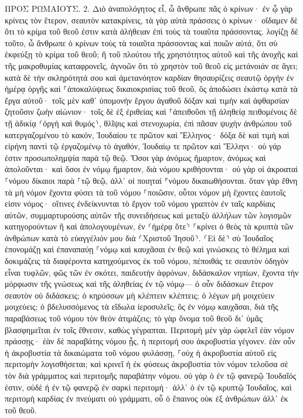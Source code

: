 \documentclass[twoside, 9pt]{extreport}
\begin{document}
ΠΡΟΣ ΡΩΜΑΙΟΥΣ.
2.
Διὸ ἀναπολόγητος εἶ, ὦ ἄνθρωπε πᾶς ὁ κρίνων· ἐν ᾧ γὰρ κρίνεις τὸν ἕτερον, σεαυτὸν κατακρίνεις, τὰ γὰρ αὐτὰ πράσσεις ὁ κρίνων· 
οἴδαμεν δὲ ὅτι τὸ κρίμα τοῦ θεοῦ ἐστιν κατὰ ἀλήθειαν ἐπὶ τοὺς τὰ τοιαῦτα πράσσοντας. 
λογίζῃ δὲ τοῦτο, ὦ ἄνθρωπε ὁ κρίνων τοὺς τὰ τοιαῦτα πράσσοντας καὶ ποιῶν αὐτά, ὅτι σὺ ἐκφεύξῃ τὸ κρίμα τοῦ θεοῦ; 
ἢ τοῦ πλούτου τῆς χρηστότητος αὐτοῦ καὶ τῆς ἀνοχῆς καὶ τῆς μακροθυμίας καταφρονεῖς, ἀγνοῶν ὅτι τὸ χρηστὸν τοῦ θεοῦ εἰς μετάνοιάν σε ἄγει; 
κατὰ δὲ τὴν σκληρότητά σου καὶ ἀμετανόητον καρδίαν θησαυρίζεις σεαυτῷ ὀργὴν ἐν ἡμέρᾳ ὀργῆς καὶ ⸀ἀποκαλύψεως δικαιοκρισίας τοῦ θεοῦ, 
ὃς ἀποδώσει ἑκάστῳ κατὰ τὰ ἔργα αὐτοῦ· 
τοῖς μὲν καθ᾽ ὑπομονὴν ἔργου ἀγαθοῦ δόξαν καὶ τιμὴν καὶ ἀφθαρσίαν ζητοῦσιν ζωὴν αἰώνιον· 
τοῖς δὲ ἐξ ἐριθείας καὶ ⸀ἀπειθοῦσι τῇ ἀληθείᾳ πειθομένοις δὲ τῇ ἀδικίᾳ ⸂ὀργὴ καὶ θυμός⸃, 
θλῖψις καὶ στενοχωρία, ἐπὶ πᾶσαν ψυχὴν ἀνθρώπου τοῦ κατεργαζομένου τὸ κακόν, Ἰουδαίου τε πρῶτον καὶ Ἕλληνος· 
δόξα δὲ καὶ τιμὴ καὶ εἰρήνη παντὶ τῷ ἐργαζομένῳ τὸ ἀγαθόν, Ἰουδαίῳ τε πρῶτον καὶ Ἕλληνι· 
οὐ γάρ ἐστιν προσωπολημψία παρὰ τῷ θεῷ. 
Ὅσοι γὰρ ἀνόμως ἥμαρτον, ἀνόμως καὶ ἀπολοῦνται· καὶ ὅσοι ἐν νόμῳ ἥμαρτον, διὰ νόμου κριθήσονται· 
οὐ γὰρ οἱ ἀκροαταὶ ⸀νόμου δίκαιοι παρὰ ⸀τῷ θεῷ, ἀλλ᾽ οἱ ποιηταὶ ⸁νόμου δικαιωθήσονται. 
ὅταν γὰρ ἔθνη τὰ μὴ νόμον ἔχοντα φύσει τὰ τοῦ νόμου ⸀ποιῶσιν, οὗτοι νόμον μὴ ἔχοντες ἑαυτοῖς εἰσιν νόμος· 
οἵτινες ἐνδείκνυνται τὸ ἔργον τοῦ νόμου γραπτὸν ἐν ταῖς καρδίαις αὐτῶν, συμμαρτυρούσης αὐτῶν τῆς συνειδήσεως καὶ μεταξὺ ἀλλήλων τῶν λογισμῶν κατηγορούντων ἢ καὶ ἀπολογουμένων, 
ἐν ⸂ἡμέρᾳ ὅτε⸃ ⸀κρίνει ὁ θεὸς τὰ κρυπτὰ τῶν ἀνθρώπων κατὰ τὸ εὐαγγέλιόν μου διὰ ⸂Χριστοῦ Ἰησοῦ⸃. 
⸂Εἰ δὲ⸃ σὺ Ἰουδαῖος ἐπονομάζῃ καὶ ἐπαναπαύῃ ⸀νόμῳ καὶ καυχᾶσαι ἐν θεῷ 
καὶ γινώσκεις τὸ θέλημα καὶ δοκιμάζεις τὰ διαφέροντα κατηχούμενος ἐκ τοῦ νόμου, 
πέποιθάς τε σεαυτὸν ὁδηγὸν εἶναι τυφλῶν, φῶς τῶν ἐν σκότει, 
παιδευτὴν ἀφρόνων, διδάσκαλον νηπίων, ἔχοντα τὴν μόρφωσιν τῆς γνώσεως καὶ τῆς ἀληθείας ἐν τῷ νόμῳ— 
ὁ οὖν διδάσκων ἕτερον σεαυτὸν οὐ διδάσκεις; ὁ κηρύσσων μὴ κλέπτειν κλέπτεις; 
ὁ λέγων μὴ μοιχεύειν μοιχεύεις; ὁ βδελυσσόμενος τὰ εἴδωλα ἱεροσυλεῖς; 
ὃς ἐν νόμῳ καυχᾶσαι, διὰ τῆς παραβάσεως τοῦ νόμου τὸν θεὸν ἀτιμάζεις; 
τὸ γὰρ ὄνομα τοῦ θεοῦ δι᾽ ὑμᾶς βλασφημεῖται ἐν τοῖς ἔθνεσιν, καθὼς γέγραπται. 
Περιτομὴ μὲν γὰρ ὠφελεῖ ἐὰν νόμον πράσσῃς· ἐὰν δὲ παραβάτης νόμου ᾖς, ἡ περιτομή σου ἀκροβυστία γέγονεν. 
ἐὰν οὖν ἡ ἀκροβυστία τὰ δικαιώματα τοῦ νόμου φυλάσσῃ, ⸀οὐχ ἡ ἀκροβυστία αὐτοῦ εἰς περιτομὴν λογισθήσεται; 
καὶ κρινεῖ ἡ ἐκ φύσεως ἀκροβυστία τὸν νόμον τελοῦσα σὲ τὸν διὰ γράμματος καὶ περιτομῆς παραβάτην νόμου. 
οὐ γὰρ ὁ ἐν τῷ φανερῷ Ἰουδαῖός ἐστιν, οὐδὲ ἡ ἐν τῷ φανερῷ ἐν σαρκὶ περιτομή· 
ἀλλ᾽ ὁ ἐν τῷ κρυπτῷ Ἰουδαῖος, καὶ περιτομὴ καρδίας ἐν πνεύματι οὐ γράμματι, οὗ ὁ ἔπαινος οὐκ ἐξ ἀνθρώπων ἀλλ᾽ ἐκ τοῦ θεοῦ. 
\end{document}
